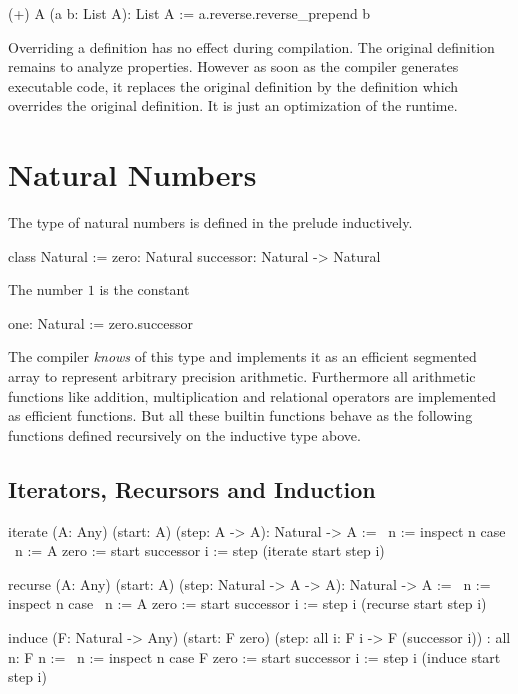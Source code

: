 \begin{alba}
  (+) A (a b: List A): List A :=
    a.reverse.reverse_prepend b
\end{alba}

Overriding a definition has no effect during compilation. The original
definition remains to analyze properties. However as soon as the compiler
generates executable code, it replaces the original definition by the
definition which overrides the original definition. It is just an optimization
of the runtime.





\section{Natural Numbers}


The type of natural numbers is defined in the prelude inductively.

\begin{alba}
  class Natural :=
    zero: Natural
    successor: Natural -> Natural
\end{alba}

The number $1$ is the constant

\begin{alba}
  one: Natural := zero.successor
\end{alba}

The compiler \emph{knows} of this type and implements it as an efficient
segmented array to represent arbitrary precision arithmetic. Furthermore all
arithmetic functions like addition, multiplication and relational operators
are implemented as efficient functions. But all these builtin functions behave
as the following functions defined recursively on the inductive type above.



\subsection{Iterators, Recursors and Induction}

\begin{alba}
    iterate (A: Any) (start: A) (step: A -> A): Natural -> A :=
        \ n :=
            inspect n case
                {\ n := A}
                zero        := start
                successor i := step (iterate start step i)

    recurse (A: Any) (start: A) (step: Natural -> A -> A): Natural -> A :=
        \ n :=
            inspect n case
                {\ n := A}
                zero        := start
                successor i := step i (recurse start step i)

    induce
        (F: Natural -> Any)
        (start: F zero)
        (step: all i: F i -> F (successor i)) :
        all n: F n
    :=
        \ n :=
            inspect n case
                {F}
                zero        := start
                successor i := step i (induce start step i)
\end{alba}


